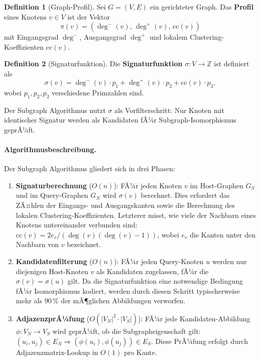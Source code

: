 ﻿\documentclass[a4paper,12pt]{scrreprt}
\theoremstyle{definition}
\newtheorem{definition}{Definition}[chapter]
\begin{document}
	\begin{definition}[Graph-Profil]
		Sei $G = (V, E)$ ein gerichteter Graph. Das \textbf{Profil} ei\-nes
		Knotens $v \in V$ ist der Vektor
		\[
		\pi(v) = (\deg^-(v),\, \deg^+(v),\, \mathrm{cc}(v))
		\]
		mit Eingangsgrad $\deg^-$, Ausgangsgrad $\deg^+$ und lokalem
		Clustering-Koeffizienten $\mathrm{cc}(v)$.
	\end{definition}

	\begin{definition}[Signaturfunktion]\label{def:sig}
		Die \textbf{Signaturfunktion} $\sigma: V \to \mathbb{Z}$ ist definiert als
		\[
		\sigma(v) = \deg^-(v) \cdot p_1 + \deg^+(v) \cdot p_2
		+ \mathrm{cc}(v) \cdot p_3,
		\]
		wobei $p_1, p_2, p_3$ verschiedene Primzahlen sind.
	\end{definition}

	Der Subgraph Algorithmus \cite{Epp2026subgraph} nutzt $\sigma$ als
	Vorfilterschritt: Nur Knoten mit identischer Signatur werden als
	Kandidaten fÃ¼r Subgraph-Isomorphismus geprÃ¼ft.

	\paragraph{Algorithmusbeschreibung.}
	Der Subgraph Algorithmus gliedert sich in drei Phasen:
	\begin{enumerate}
		\item \textbf{Signaturberechnung} ($O(n)$): FÃ¼r jeden Knoten $v$
		im Host-Graphen $G_S$ und im Query-Graphen $G_N$ wird $\sigma(v)$
		berechnet. Dies erfordert das ZÃ¤hlen der Eingangs- und Ausgangskanten
		sowie die Berechnung des lokalen Clustering-Koeffizienten. Letzterer
		misst, wie viele der Nachbarn eines Knotens untereinander verbunden sind:
		$\mathrm{cc}(v) = 2 e_v / (\deg(v)(\deg(v)-1))$, wobei $e_v$ die Kanten
		unter den Nachbarn von $v$ bezeichnet.
		\item \textbf{Kandidatenfilterung} ($O(n)$): FÃ¼r jeden Query-Knoten $u$
		werden nur diejenigen Host-Knoten $v$ als Kandidaten zugelassen, fÃ¼r die
		$\sigma(v) = \sigma(u)$ gilt. Da die Signaturfunktion eine notwendige
		Bedingung fÃ¼r Isomorphismus kodiert, werden durch diesen Schritt typischerweise
		mehr als $90\,\%$ der mÃ¶glichen Abbildungen verworfen.
		\item \textbf{AdjazenzprÃ¼fung} ($O(|V_N|^2 \cdot |V_S|)$): FÃ¼r jede
		Kandidaten-Abbildung $\phi: V_N \to V_S$ wird geprÃ¼ft, ob die
		Subgrapheigenschaft gilt: $(u_i, u_j) \in E_N \Rightarrow (\phi(u_i), \phi(u_j)) \in E_S$.
		Diese PrÃ¼fung erfolgt durch Adjazenzmatrix-Lookup in $O(1)$ pro Kante.
	\end{enumerate}
\end{document}
